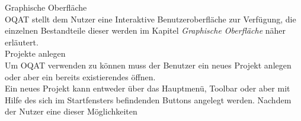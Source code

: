  Graphische Oberfläche \\
\gls{OQAT} stellt dem Nutzer eine Interaktive Benutzeroberfläche zur Verfügung, die
einzelnen Bestandteile dieser werden im Kapitel \emph{Graphische Oberfläche} näher erläutert.\\
 Projekte anlegen \\
Um \gls{OQAT} verwenden zu können muss der Benutzer ein neues Projekt anlegen oder aber
ein bereits existierendes öffnen. \\
Ein neues Projekt kann entweder über das Hauptmenü, Toolbar oder aber mit Hilfe des sich
im Startfensters befindenden Buttons angelegt werden. Nachdem der Nutzer eine dieser Möglichkeiten
